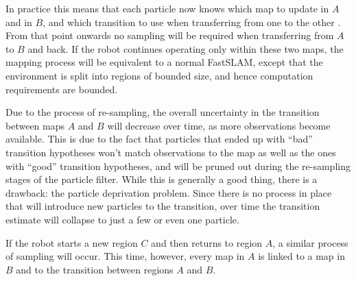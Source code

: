 In practice this means that each particle now knows which map to
update in $A$ and in $B$, and which transition to use when
transferring from one to the other . From that point onwards no sampling will be required
when transferring from $A$ to $B$ and back. If the robot continues
operating only within these two maps, the mapping process will be
equivalent to a normal FastSLAM, except that the environment is split
into regions of bounded size, and hence computation requirements are
bounded.

Due to the process of re-sampling, the overall uncertainty in the
transition between maps $A$ and $B$ will decrease over time, as more
observations become available. This is due to the fact that particles
that ended up with ``bad'' transition hypotheses won't match
observations to the map as well as the ones with ``good'' transition
hypotheses, and will be pruned out during the re-sampling stages of
the particle filter. While this is generally a good thing, there is a
drawback: the particle deprivation problem. Since there is no process in
place that will introduce new particles to the transition, over time
the transition estimate will collapse to just a few or even one
particle. 


If the robot starts a new region $C$ and then returns to
region $A$, a similar process of sampling will occur. This time,
however, every map in $A$ is linked to a map in $B$ and to the
transition between regions $A$ and $B$.


